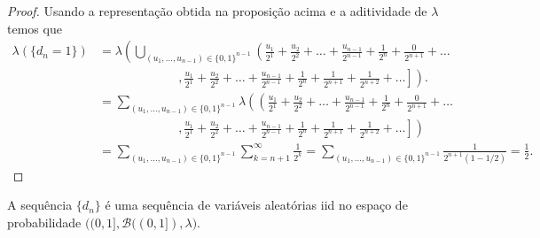 \begin{proof}
Usando a representação obtida na proposição acima e 
a aditividade de $\lambda$ temos que 
%
	\begin{align*}
		\lambda(\{d_n=1\})
		&=
		\lambda
		\left(		
			\bigcup_{(u_1,\ldots,u_{n-1})\in\{0,1\}^{n-1}}
			\left(
				\frac{u_1}{2^1}
				+\frac{u_2}{2^2}
				+\ldots+\frac{u_{n-1}}{2^{n-1}}+\frac{1}{2^{n}}
				+\frac{0}{2^{n+1}}+\ldots
			\right.
		\right.
		\\
		&\qquad\qquad\qquad
		\ \ \mathbf{,} 
		\left.
			\left.
				\frac{u_1}{2^1}+\frac{u_2}{2^2}
				+\ldots+\frac{u_{n-1}}{2^{n-1}}+\frac{1}{2^{n}}
				+\frac{1}{2^{n+1}}+\frac{1}{2^{n+2}}
				+\ldots
			\right]
		\right).
		\\[0.8cm]
%
%
		&=
		\sum_{(u_1,\ldots,u_{n-1})\in\{0,1\}^{n-1}}
		\lambda
		\left(		
			\left(
				\frac{u_1}{2^1}
				+\frac{u_2}{2^2}
				+\ldots+\frac{u_{n-1}}{2^{n-1}}+\frac{1}{2^{n}}
				+\frac{0}{2^{n+1}}+\ldots
			\right.
		\right.
		\\
		&\qquad\qquad\qquad
		\ \ \mathbf{,} 
		\left.
			\left.
				\frac{u_1}{2^1}+\frac{u_2}{2^2}
				+\ldots+\frac{u_{n-1}}{2^{n-1}}+\frac{1}{2^{n}}
				+\frac{1}{2^{n+1}}+\frac{1}{2^{n+2}}
				+\ldots
			\right]
		\right)
		\\[0.8cm]
%
%
		&=
		\sum_{(u_1,\ldots,u_{n-1})\in\{0,1\}^{n-1}}
		\sum_{k=n+1}^{\infty} \frac{1}{2^k}
		=
		\sum_{(u_1,\ldots,u_{n-1})\in\{0,1\}^{n-1}}
		\frac{1}{2^{n+1}(1-1/2)}
		=\frac{1}{2}.
	\end{align*}
\end{proof}

















\begin{proposicao}
A sequência $\{d_n\}$ é uma sequência de variáveis aleatórias iid no
espaço de probabilidade
$\Big((0,1],\mathscr{B}((0,1]),\lambda\Big)$.
\end{proposicao}


